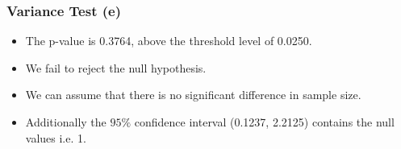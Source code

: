 \documentclass[a4]{beamer}
\begin{document}
\begin{frame}
\frametitle{Variance Test (e)}
\begin{itemize}
\item The p-value is 0.3764, above the threshold level of 0.0250.
\item We fail to reject the null hypothesis.
\item We can assume that there is no significant difference in sample size.
\item Additionally the $95\%$ confidence interval (0.1237, 2.2125) contains the null values i.e. 1.
\end{itemize}
\end{frame}
\end{document}
